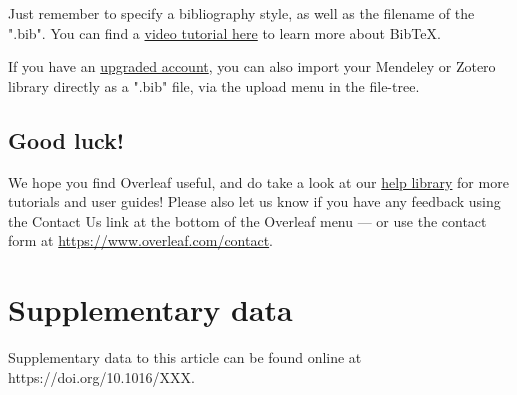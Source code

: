 \documentclass[a4paper,12pt,twoside]{article}
\begin{document}
Just remember to specify a bibliography style, as well as the filename of the ".bib". You can find a \href{https://www.overleaf.com/help/97-how-to-include-a-bibliography-using-bibtex}{video tutorial here} to learn more about BibTeX.

If you have an \href{https://www.overleaf.com/user/subscription/plans}{upgraded account}, you can also import your Mendeley or Zotero library directly as a ".bib" file, via the upload menu in the file-tree.

\subsection{Good luck!}

We hope you find Overleaf useful, and do take a look at our \href{https://www.overleaf.com/learn}{help library} for more tutorials and user guides! Please also let us know if you have any feedback using the Contact Us link at the bottom of the Overleaf menu --- or use the contact form at \url{https://www.overleaf.com/contact}.

\section*{Supplementary data}
Supplementary data to this article can be found online at https://doi.org/10.1016/XXX.

\setlength{\bibhang}{0pt} %



\end{document}
